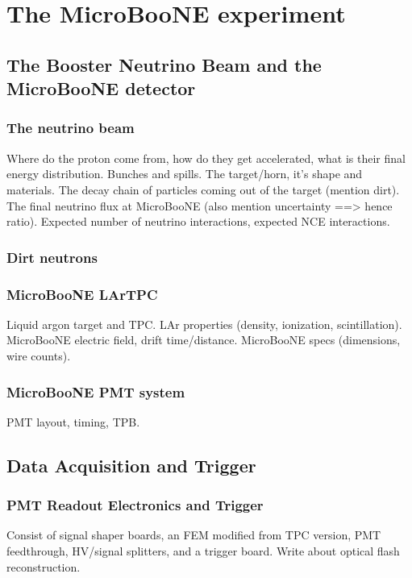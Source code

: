 \section{The MicroBooNE experiment}\label{microboone}

\subsection{The Booster Neutrino Beam and the MicroBooNE detector}\label{beam}
  \subsubsection{The neutrino beam}
    Where do the proton come from, how do they get accelerated, what is their final energy distribution.
    Bunches and spills.
    The target/horn, it's shape and materials.
    The decay chain of particles coming out of the target (mention dirt).
    The final neutrino flux at MicroBooNE (also mention uncertainty ==> hence ratio).
    Expected number of neutrino interactions, expected NCE interactions.
  \subsubsection{Dirt neutrons}
  \subsubsection{MicroBooNE LArTPC}
    Liquid argon target and TPC.
    LAr properties (density, ionization, scintillation).
    MicroBooNE electric field, drift time/distance.
    MicroBooNE specs (dimensions, wire counts).
  \subsubsection{MicroBooNE PMT system}
    PMT layout, timing, TPB.

\subsection{Data Acquisition and Trigger}\label{daq}
  \subsubsection{PMT Readout Electronics and Trigger}
    Consist of signal shaper boards, an FEM modified from TPC version, PMT
    feedthrough, HV/signal splitters, and a trigger board. Write about optical
    flash reconstruction.
